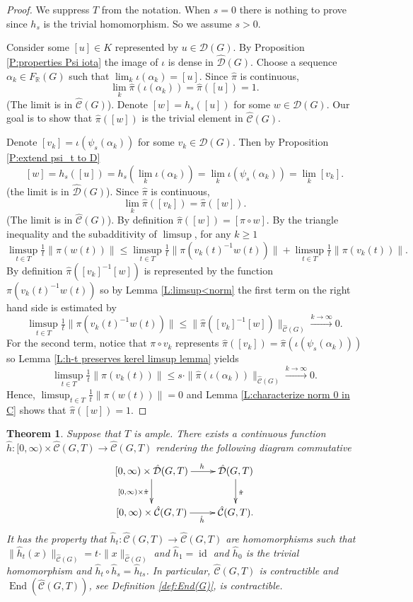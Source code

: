 \documentclass[12pt]{amsart}
\newtheorem{theorem}[prop]{Theorem}
\theoremstyle{definition}
\def\RR{\ensuremath{\mathbb{R}}}
\newcommand{\C}[1]{\mathcal{#1}}
\newcommand{\xto}[1]{\xrightarrow{#1}}
\newcommand{\OP}[1]{\operatorname{#1}}
\def\Free{F}
\def\D{\mathcal{D}}
\def\tC{\hat{\mathcal{C}}}
\def\tD{\hat{\D}}
\begin{document}
\begin{proof}
We suppress $T$ from the notation.
When $s=0$ there is nothing to prove since $h_s$ is the trivial homomorphism. 
So we assume $s>0$.

Consider some $[u] \in K$ represented by $u \in \C D(G)$.
By Proposition \ref{P:properties Psi iota} the image of $\iota$ is dense in $\tD(G)$.
Choose a sequence $\alpha_k \in \Free_\RR(G)$ such that $\lim_k \iota(\alpha_k)=[u]$.
Since $\hat{\pi}$ is continuous,
\[
\lim_k \hat{\pi}(\iota(\alpha_k))=\hat{\pi}([u])=1.
\] 
(The limit is in $\tC(G)$).
Denote $[w]=h_s([u])$ for some $w \in \C D(G)$.
Our goal is to show that $\hat{\pi}([w])$ is the trivial element in $\tC(G)$.

Denote $[v_k]=\iota(\psi_s(\alpha_k))$ for some $v_k \in \C D(G)$.
Then by Proposition \ref{P:extend psi_t to D}
\[
[w]=h_s([u])=h_s(\lim_k \iota(\alpha_k)) = \lim_k \iota(\psi_s(\alpha_k))= \lim_k [v_k].
\]
(the limit is in $\tD(G)$).
Since $\hat{\pi}$ is continuous, 
\[
\lim_k \hat{\pi}([v_k]) = \hat{\pi}([w]).
\]
(The limit is in $\tC(G)$).
By definition $\hat{\pi}([w])=[\pi \circ w]$.
By the triangle inequality and the subadditivity of $\limsup$, for any $k \geq 1$
\[
\limsup_{t \in T} \tfrac{1}{t} \| \pi(w(t))\| \leq
\limsup_{t \in T} \tfrac{1}{t}\| \pi(v_k(t)^{-1}w(t))\| + \limsup_{t \in T} \tfrac{1}{t} \|\pi(v_k(t))\|.
\]
By definition $\hat{\pi}([v_k]^{-1}[w])$ is represented by the function $\pi(v_k(t)^{-1}w(t))$ so by Lemma \ref{L:limsup<norm} the first term on the right hand side is estimated by
\[
\limsup_{t \in T} \tfrac{1}{t}\| \pi(v_k(t)^{-1}w(t))\| \leq \|\hat{\pi}([v_k]^{-1}[w])\|_{\tC(G)} \xto{k \to \infty} 0.
\]
For the second term, notice that $\pi \circ v_k$ represents $\hat{\pi}([v_k]) = \hat{\pi}(\iota(\psi_s(\alpha_k)))$ so Lemma \ref{L:h-t preserves kerel limsup lemma} yields
\[
\limsup_{t \in T} \tfrac{1}{t} \|\pi(v_k(t))\| \leq s \cdot \| \hat{\pi}(\iota(\alpha_k))\|_{\tC(G)} \xto{k \to \infty} 0.
\]
Hence, $\limsup_{t \in T} \tfrac{1}{t} \| \pi(w(t))\| =0$ and  Lemma \ref{L:characterize norm 0 in C} shows that $\hat{\pi}([w])=1$.
\end{proof}




\begin{theorem}\label{T:tC contractible}
Suppose that $T$ is ample.
There exists a continuous function $\hat{h} \colon [0,\infty) \times \tC(G,T) \to \tC(G,T)$ rendering the following diagram commutative
\[
\xymatrix{
[0,\infty) \times \tD(G,T) \ar[r]^(0.6){h} \ar[d]_{[0,\infty) \times \hat{\pi}} &
\tD(G,T) \ar[d]^{\hat{\pi}}
\\
[0,\infty) \times \tC(G,T) \ar[r]_(0.6){\hat{h}} & 
\tC(G,T).
}
\]
It has the property that $\hat{h}_t \colon \tC(G,T) \to \tC(G,T)$ are homomorphisms such that $\|\hat{h}_t(x)\|_{\tC(G)} = t \cdot \|x\|_{\tC(G)}$ and $\hat{h}_1=\OP{id}$ and $\hat{h}_0$ is the trivial homomorphism and $\hat{h}_t \circ \hat{h}_s = \hat{h}_{ts}$.
In particular, $\tC(G,T)$ is contractible and $\OP{End}(\tC(G,T))$, see Definition \ref{def:End(G)}, is contractible.
\end{theorem}
\end{document}
